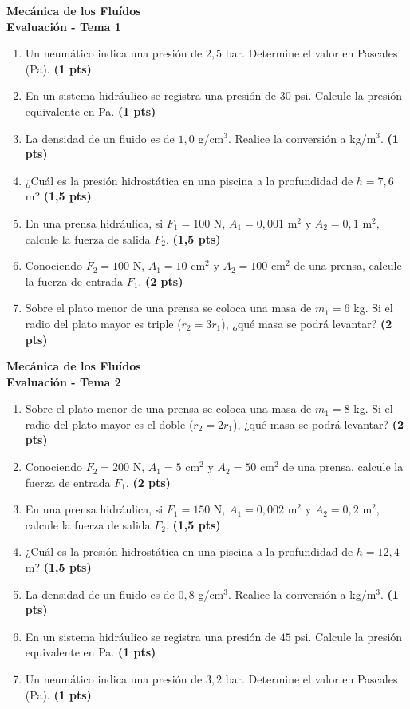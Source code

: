 \documentclass[a4paper,12pt]{article}
\newcommand{\prob}[2]{\item #1 \textbf{(#2 pts)}}
\begin{document}
\noindent
\begin{minipage}[t][0.47\textheight][t]{0.48\textwidth}
  \begin{center}
    \textbf{\large Mecánica de los Fluídos}\\
    \textbf{\Large Evaluación - Tema 1}
  \end{center}
  \begin{enumerate}
    \prob{Un neumático indica una presión de $2,5$ bar. Determine el valor en Pascales (Pa).}{1}
    \prob{En un sistema hidráulico se registra una presión de $30$ psi. Calcule la presión equivalente en Pa.}{1}
    \prob{La densidad de un fluido es de $1,0$ g/cm$^3$. Realice la conversión a kg/m$^3$.}{1}
    \prob{¿Cuál es la presión hidrostática en una piscina a la profundidad de $h=7,6$ m?}{1,5}
    \prob{En una prensa hidráulica, si $F_1=100$ N, $A_1=0,001$ m$^2$ y $A_2=0,1$ m$^2$, calcule la fuerza de salida $F_2$.}{1,5}
    \prob{Conociendo $F_2=100$ N, $A_1=10$ cm$^2$ y $A_2=100$ cm$^2$ de una prensa, calcule la fuerza de entrada $F_1$.}{2}
    \prob{Sobre el plato menor de una prensa se coloca una masa de $m_1=6$ kg. Si el radio del plato mayor es triple ($r_2=3r_1$), ¿qué masa se podrá levantar?}{2}
  \end{enumerate}
\end{minipage}
\hfill
\begin{minipage}[t][0.47\textheight][t]{0.48\textwidth}
  \begin{center}
    \textbf{\large Mecánica de los Fluídos}\\
    \textbf{\Large Evaluación - Tema 2}
  \end{center}
  \begin{enumerate}
    \prob{Sobre el plato menor de una prensa se coloca una masa de $m_1=8$ kg. Si el radio del plato mayor es el doble ($r_2=2r_1$), ¿qué masa se podrá levantar?}{2}
    \prob{Conociendo $F_2=200$ N, $A_1=5$ cm$^2$ y $A_2=50$ cm$^2$ de una prensa, calcule la fuerza de entrada $F_1$.}{2}
    \prob{En una prensa hidráulica, si $F_1=150$ N, $A_1=0,002$ m$^2$ y $A_2=0,2$ m$^2$, calcule la fuerza de salida $F_2$.}{1,5}
    \prob{¿Cuál es la presión hidrostática en una piscina a la profundidad de $h=12,4$ m?}{1,5}
    \prob{La densidad de un fluido es de $0,8$ g/cm$^3$. Realice la conversión a kg/m$^3$.}{1}
    \prob{En un sistema hidráulico se registra una presión de $45$ psi. Calcule la presión equivalente en Pa.}{1}
    \prob{Un neumático indica una presión de $3,2$ bar. Determine el valor en Pascales (Pa).}{1}
  \end{enumerate}
\end{minipage}
\end{document}
